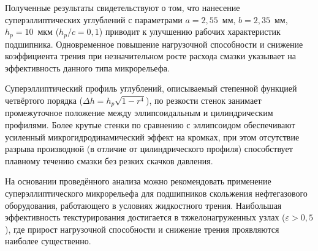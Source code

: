 Полученные результаты свидетельствуют о том, что нанесение суперэллиптических углублений с параметрами $a = 2{,}55$~мм, $b = 2{,}35$~мм, $h_p = 10$~мкм ($h_p/c = 0{,}1$) приводит к улучшению рабочих характеристик подшипника. Одновременное повышение нагрузочной способности и снижение коэффициента трения при незначительном росте расхода смазки указывает на эффективность данного типа микрорельефа.

Суперэллиптический профиль углублений, описываемый степенной функцией четвёртого порядка ($\Delta h = h_p \sqrt{1 - r^4}$), по резкости стенок занимает промежуточное положение между эллипсоидальным и цилиндрическим профилями. Более крутые стенки по сравнению с эллипсоидом обеспечивают усиленный микрогидродинамический эффект на кромках, при этом отсутствие разрыва производной (в отличие от цилиндрического профиля) способствует плавному течению смазки без резких скачков давления.

На основании проведённого анализа можно рекомендовать применение суперэллиптического микрорельефа для подшипников скольжения нефтегазового оборудования, работающего в условиях жидкостного трения. Наибольшая эффективность текстурирования достигается в тяжелонагруженных узлах ($\varepsilon > 0{,}5$), где прирост нагрузочной способности и снижение трения проявляются наиболее существенно.
